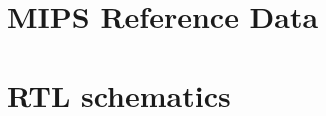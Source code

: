 \begin{appendices}
\appendixpage

\section{MIPS Reference Data}
\label{MIPS_SHEET}


\section{RTL schematics}
\label{RTL}

\end{appendices}
